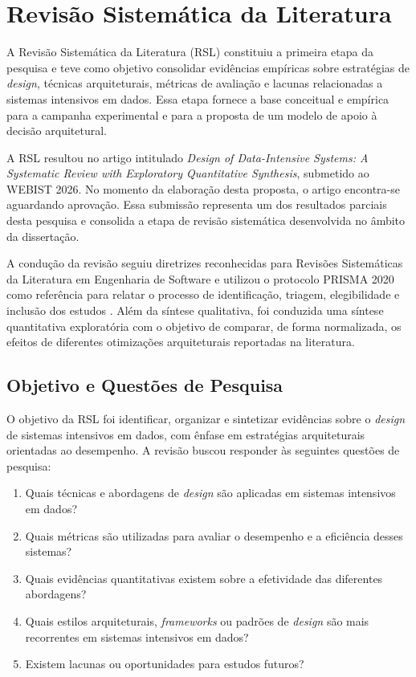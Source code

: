 \chapter{Revisão Sistemática da Literatura}
\label{cap:rsl}

A Revisão Sistemática da Literatura (RSL) constituiu a primeira etapa da pesquisa e teve como objetivo consolidar evidências empíricas sobre estratégias de \textit{design}, técnicas arquiteturais, métricas de avaliação e lacunas relacionadas a sistemas intensivos em dados. Essa etapa fornece a base conceitual e empírica para a campanha experimental e para a proposta de um modelo de apoio à decisão arquitetural.

A RSL resultou no artigo intitulado \textit{Design of Data-Intensive Systems: A Systematic Review with Exploratory Quantitative Synthesis}, submetido ao WEBIST 2026. No momento da elaboração desta proposta, o artigo encontra-se aguardando aprovação. Essa submissão representa um dos resultados parciais desta pesquisa e consolida a etapa de revisão sistemática desenvolvida no âmbito da dissertação.

A condução da revisão seguiu diretrizes reconhecidas para Revisões Sistemáticas da Literatura em Engenharia de Software \cite{kitchenham2007guidelines,kitchtchenham2009,kitchenham2015evidence} e utilizou o protocolo PRISMA 2020 como referência para relatar o processo de identificação, triagem, elegibilidade e inclusão dos estudos \cite{page2021prisma}. Além da síntese qualitativa, foi conduzida uma síntese quantitativa exploratória com o objetivo de comparar, de forma normalizada, os efeitos de diferentes otimizações arquiteturais reportadas na literatura.

\section{Objetivo e Questões de Pesquisa}
\label{sec:rsl-objetivo}

O objetivo da RSL foi identificar, organizar e sintetizar evidências sobre o \textit{design} de sistemas intensivos em dados, com ênfase em estratégias arquiteturais orientadas ao desempenho. A revisão buscou responder às seguintes questões de pesquisa:

\begin{enumerate}
    \item Quais técnicas e abordagens de \textit{design} são aplicadas em sistemas intensivos em dados?
    \item Quais métricas são utilizadas para avaliar o desempenho e a eficiência desses sistemas?
    \item Quais evidências quantitativas existem sobre a efetividade das diferentes abordagens?
    \item Quais estilos arquiteturais, \textit{frameworks} ou padrões de \textit{design} são mais recorrentes em sistemas intensivos em dados?
    \item Existem lacunas ou oportunidades para estudos futuros?
\end{enumerate}

